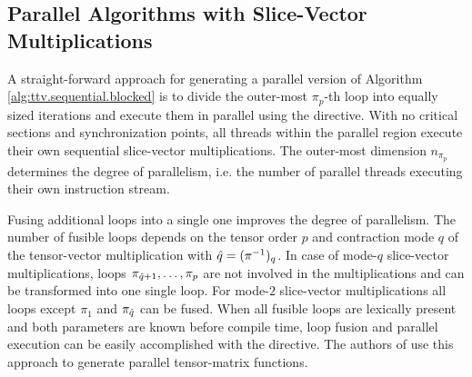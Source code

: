 \subsection{Parallel Algorithms with Slice-Vector Multiplications}
\label{subsec:parallel.multi-loops}
A straight-forward approach for generating a parallel version of Algorithm \ref{alg:ttv.sequential.blocked} is to divide the outer-most $\pi_p$-th loop into equally sized iterations and execute them in parallel using the    directive\cite{bassoy:2018:fast}.
With no critical sections and synchronization points, all threads within the parallel region execute their own sequential slice-vector multiplications.
The outer-most dimension $n_{\pi_p}$ determines the degree of parallelism, i.e. the number of parallel threads executing their own instruction stream.


Fusing additional loops into a single one improves the degree of parallelism.
The number of fusible loops depends on the tensor order $p$ and contraction mode $q$ of the tensor-vector multiplication with $\hat{q} = (\pi^{-1})_q$.
In case of mode-$q$ slice-vector multiplications, loops $\pi_{\hat{q}+1}, \dots, \pi_{p}$ are not involved in the multiplications and can be transformed into one single loop.
For mode-$2$ slice-vector multiplications all loops except $\pi_1$ and $\pi_{\hat{q}}$ can be fused.
When all fusible loops are lexically present and both parameters are known before compile time, loop fusion and parallel execution can be easily accomplished with the   directive.
The authors of \cite{li:2015:input} use this approach to generate parallel tensor-matrix functions.

